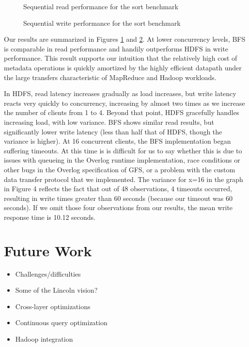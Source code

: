 \documentclass{article}
\begin{document}
\begin{figure}
\centering
{}
\caption{Sequential read performance for the sort benchmark}
\label{fig:big-read-perf}
\end{figure}
\begin{figure}
\centering
{}
\caption{Sequential write performance for the sort benchmark}
\label{fig:big-write-perf}
\end{figure}
Our results are summarized in Figures \ref{fig:big-read-perf} and
\ref{fig:big-write-perf}.  At lower concurrency levels, BFS is
comparable in read performance and handily outperforms HDFS in write
performance.  This result supports our intuition that the relatively
high cost of metadata operations is quickly amortized by the highly
efficient datapath under the large transfers characteristic of
MapReduce and Hadoop workloads.

In HDFS, read latency increases gradually as load increases, but write
latency reacts very quickly to concurrency, increasing by almost two
times as we increase the number of clients from 1 to 4.  Beyond that
point, HDFS gracefully handles increasing load, with low variance.
BFS shows similar read results, but significantly lower write latency
(less than half that of HDFS, though the variance is higher).  At 16
concurrent clients, the BFS implementation began suffering timeouts.
At this time is is difficult for us to say whether this is due to
issues with queueing in the Overlog runtime implementation, race
conditions or other bugs in the Overlog specification of GFS, or a
problem with the custom data transfer protocol that we implemented.
The variance for x=16 in the graph in Figure 4 reflects the fact that
out of 48 observations, 4 timeouts occurred, resulting in write times
greater than 60 seconds (because our timeout was 60 seconds).  If we
omit those four observations from our results, the mean write response
time is 10.12 seconds.

\section{Future Work}
\label{future-work}
\begin{itemize}
\item
  Challenges/difficulties

\item
  Some of the Lincoln vision?

\item
  Cross-layer optimizations

\item
  Continuous query optimization

\item
  Hadoop integration
\end{itemize}
\end{document}
